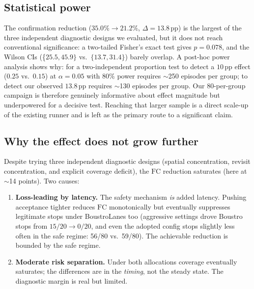 \documentclass[11pt]{article}
\newcommand{\FC}{\mathrm{FC}}
\newcommand{\ra}{\rightarrow}
\begin{document}
\subsection{Statistical power}
The confirmation reduction ($35.0\% \to 21.2\%$, $\Delta{=}13.8$\,pp) is the largest of the three
independent diagnostic designs we evaluated, but it does not reach conventional significance: a
two-tailed Fisher's exact test gives $p=0.078$, and the Wilson CIs (\{$25.5,45.9\}$ vs.\
$\{13.7,31.4\}$) barely overlap. A post-hoc power analysis shows why: for a two-independent
proportion test to detect a $10$\,pp effect ($0.25$ vs.\ $0.15$) at $\alpha{=}0.05$ with $80\%$
power requires $\sim$250 episodes per group; to detect our observed $13.8$\,pp requires
$\sim$130 episodes per group. Our 80-per-group campaign is therefore genuinely informative about
effect magnitude but underpowered for a decisive test. Reaching that larger sample is a direct
scale-up of the existing runner and is left as the primary route to a significant claim.

\subsection{Why the effect does not grow further}
Despite trying three independent diagnostic designs (spatial concentration, revisit concentration,
and explicit coverage deficit), the $\FC$ reduction saturates (here at $\sim$14 points). Two causes:
\begin{enumerate}
\item \textbf{Loss-leading by latency.} The safety mechanism \emph{is} added latency. Pushing
acceptance tighter reduces $\FC$ monotonically but eventually suppresses legitimate stops under
BoustroLanes too (aggressive settings drove Boustro stops from $15/20 \ra 0/20$, and even the
adopted config stops slightly less often in the safe regime: 56/80 vs.\ 59/80). The achievable
reduction is bounded by the safe regime.
\item \textbf{Moderate risk separation.} Under both allocations coverage eventually saturates; the
differences are in the \emph{timing}, not the steady state. The diagnostic margin is real but
limited.
\end{enumerate}
\end{document}
